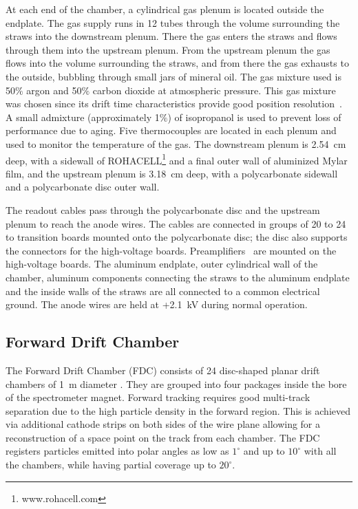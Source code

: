 At each end of the chamber, a cylindrical gas plenum is located outside the endplate.  
The gas supply runs in 12 tubes through the volume surrounding the straws into the downstream plenum. 
There the gas enters the straws and flows through them into the upstream plenum. From the upstream plenum the gas flows into the volume surrounding the straws, and from there the gas exhausts to the outside, bubbling through small jars of mineral oil.
The gas mixture used is 50$\%$ argon and 50$\%$ carbon dioxide at atmospheric pressure. 
This gas mixture was chosen since its drift time characteristics provide good position resolution~\cite{VanHaarlem:2010yq}.
A small admixture (approximately 1$\%$) of isopropanol is used to prevent loss of performance due to aging\cite{KADYK1991436,VAVRA20031}. 
Five thermocouples are located in each plenum and used to monitor the temperature of the gas.
The downstream plenum is 2.54~cm deep, with a sidewall of ROHACELL\footnote{www.rohacell.com} and a final outer wall of aluminized Mylar film, and the upstream plenum is 3.18~cm deep, with a polycarbonate sidewall and a polycarbonate disc outer wall. 

The readout cables pass through the polycarbonate disc and the upstream plenum to reach the anode wires. 
The cables are connected in groups of 20 to 24 to transition boards mounted onto the polycarbonate disc; the disc also supports the connectors for the high-voltage boards. 
Preamplifiers~\cite{hdnote2515} are mounted on the high-voltage boards. The aluminum endplate, outer cylindrical wall of the chamber, aluminum components connecting the straws to the aluminum endplate and the inside walls of the straws are all connected to a common electrical ground. 
The anode wires are held at +2.1~kV during normal operation. 


\subsection[Forward Drift Chamber]{Forward Drift Chamber
\label{sec:fdc} }

The Forward Drift Chamber (FDC) consists of 24 disc-shaped planar drift chambers of 1~m diameter \cite{FDC_NIM}.
They are grouped into four packages inside the bore of the spectrometer magnet.
Forward tracking requires good multi-track separation due to the
high particle density in the forward region.
This is achieved via additional cathode strips on both sides of the wire plane allowing for a  reconstruction of a space point on the track from each chamber. 
The FDC registers particles emitted into polar angles as low as $1^\circ$ and up to $10^\circ $
with all the chambers, while having partial coverage up to $20^\circ$.

